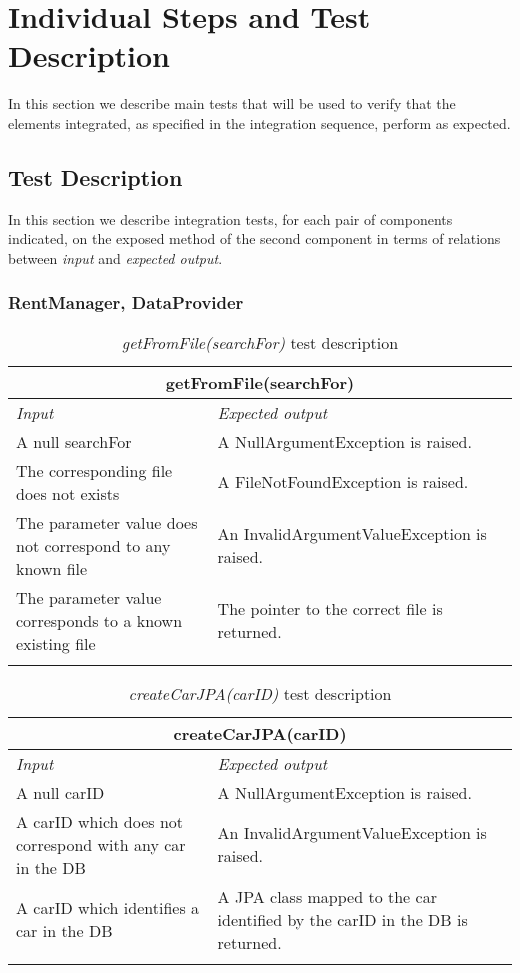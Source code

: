 \section{Individual Steps and Test Description}

In this section we describe main tests that will be used to verify that the elements integrated, as specified in the integration sequence, perform as expected. 

\subsection{Test Description}

In this section we describe integration tests, for each pair of components indicated, on the exposed method of the second component in terms of relations between \emph{input} and \emph{expected output}.

\subsubsection{RentManager, DataProvider}

\begin{longtable}{p{0.4\linewidth}p{0.6\linewidth}}
\multicolumn{2}{c}{\textbf{getFromFile(searchFor)}} \\
\toprule
\emph{Input} & \emph{Expected output} \\
\midrule
A null searchFor & A NullArgumentException is raised.\\
\midrule
The corresponding file does not exists & A FileNotFoundException is raised. \\
\midrule
The parameter value does not correspond to any known file & An InvalidArgumentValueException is raised. \\
\midrule
The parameter value corresponds to a known existing file & The pointer to the correct file is returned. \\
\bottomrule
\caption{\emph{getFromFile(searchFor)} test description}
\end{longtable}

\begin{longtable}{p{0.4\linewidth}p{0.6\linewidth}}
\multicolumn{2}{c}{\textbf{createCarJPA(carID)}} \\
\toprule
\emph{Input} & \emph{Expected output} \\
\midrule
A null carID & A NullArgumentException is raised.\\
\midrule
A carID which does not correspond with any car in the DB & An InvalidArgumentValueException is raised. \\
\midrule
A carID which identifies a car in the DB & A JPA class mapped to the car identified by the carID in the DB is returned. \\
\bottomrule
\caption{\emph{createCarJPA(carID)} test description}
\end{longtable}


